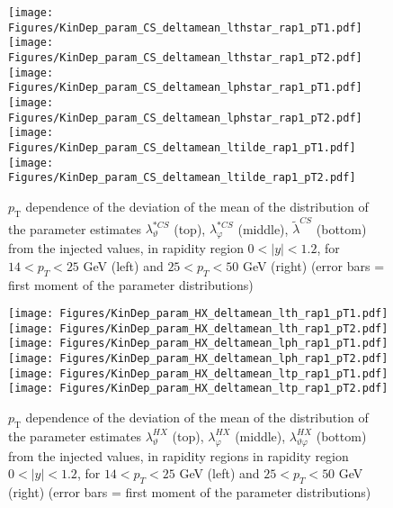 \documentclass[12pt]{article}
\newcommand{\pT}{p_\mathrm{T}}
\newcommand{\absy}{\left |  y \right |}
\newcommand{\lamtildeCS}{\tilde{\lambda}^{\scriptscriptstyle CS}}
\newcommand{\lamthstarCS}{\lambda^{* \scriptscriptstyle CS}_\vartheta}
\newcommand{\lamphstarCS}{\lambda^{* \scriptscriptstyle CS}_\varphi}
\newcommand{\lamthHX}{\lambda^{\scriptscriptstyle HX}_\vartheta}
\newcommand{\lamphHX}{\lambda^{\scriptscriptstyle HX}_\varphi}
\newcommand{\lamthphHX}{\lambda^{\scriptscriptstyle HX}_{\vartheta \varphi}}
\begin{document}
\begin{figure}[htbp]
\centering
\texttt{[image: Figures/KinDep\_param\_CS\_deltamean\_lthstar\_rap1\_pT1.pdf]}
\texttt{[image: Figures/KinDep\_param\_CS\_deltamean\_lthstar\_rap1\_pT2.pdf]}
\texttt{[image: Figures/KinDep\_param\_CS\_deltamean\_lphstar\_rap1\_pT1.pdf]}
\texttt{[image: Figures/KinDep\_param\_CS\_deltamean\_lphstar\_rap1\_pT2.pdf]}
\texttt{[image: Figures/KinDep\_param\_CS\_deltamean\_ltilde\_rap1\_pT1.pdf]}
\texttt{[image: Figures/KinDep\_param\_CS\_deltamean\_ltilde\_rap1\_pT2.pdf]}
\caption{$\pT$ dependence of the deviation of the mean of the distribution of
the parameter estimates $\lamthstarCS$ (top), $\lamphstarCS$ (middle),
$\lamtildeCS$ (bottom) from the injected values, in rapidity region $0<\absy<1.2$, for $14 < p_T < 25$ GeV (left) and
$25 < p_T < 50$ GeV (right) (error bars = first moment of
the parameter distributions)}
\end{figure}
\clearpage









\begin{figure}[htbp]
\centering
\texttt{[image: Figures/KinDep\_param\_HX\_deltamean\_lth\_rap1\_pT1.pdf]}
\texttt{[image: Figures/KinDep\_param\_HX\_deltamean\_lth\_rap1\_pT2.pdf]}
\texttt{[image: Figures/KinDep\_param\_HX\_deltamean\_lph\_rap1\_pT1.pdf]}
\texttt{[image: Figures/KinDep\_param\_HX\_deltamean\_lph\_rap1\_pT2.pdf]}
\texttt{[image: Figures/KinDep\_param\_HX\_deltamean\_ltp\_rap1\_pT1.pdf]}
\texttt{[image: Figures/KinDep\_param\_HX\_deltamean\_ltp\_rap1\_pT2.pdf]}
\caption{$\pT$ dependence of the deviation of the mean of the distribution of
the parameter estimates $\lamthHX$ (top), $\lamphHX$ (middle), $\lamthphHX$
(bottom) from the injected values, in rapidity regions in rapidity region $0<\absy<1.2$, for $14 < p_T < 25$ GeV (left) and
$25 < p_T < 50$ GeV (right) (error bars = first moment of the parameter
distributions)}
\end{figure}
\clearpage
\end{document}

